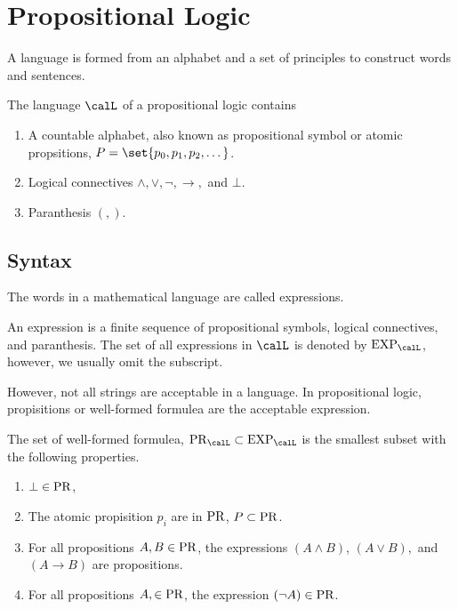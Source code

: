 \chapter{Propositional Logic}

A language is formed from an alphabet and a set of principles to construct words and sentences.

\begin{definition}
    The language \(\calL\) of a propositional logic contains
    \begin{enumerate}
        \item A countable alphabet, also known as propositional symbol or atomic propsitions, \(P = \set{p_0, p_1, p_2,\dots}\).
        \item Logical connectives \(\land, \lor, \neg, \to,\) and \(\bot\).
        \item Paranthesis \((,)\).
    \end{enumerate}
\end{definition}
\section{Syntax}
The words in a mathematical language are called expressions.

\begin{definition}
    An expression is a finite sequence of propositional symbols, logical connectives, and paranthesis. The set of all expressions in \(\calL\) is denoted by \(\LEXP_{\calL}\), however, we usually omit the subscript.
\end{definition}

However, not all strings are acceptable in a language. In propositional logic, propisitions or well-formed formulea are the acceptable expression.

\begin{definition}
    The set of well-formed formulea, \(\LPR_{\calL} \subset \LEXP_{\calL}\) is the smallest subset with the following properties.
    \begin{enumerate}
        \item \(\bot \in \operatorname{PR}\),
        \item The atomic propisition \(p_i\) are in \(\operatorname{PR}\), \(P \subset \operatorname{PR}\).
        \item For all propositions \(A,B \in \operatorname{PR}\), the expressions \((A \land B)\), \((A \lor B),\) and \((A \to B)\) are propositions.
        \item For all propositions \(A, \in \operatorname{PR}\), the expression \((\neg A) \in \operatorname{PR}\).
    \end{enumerate}
\end{definition}

